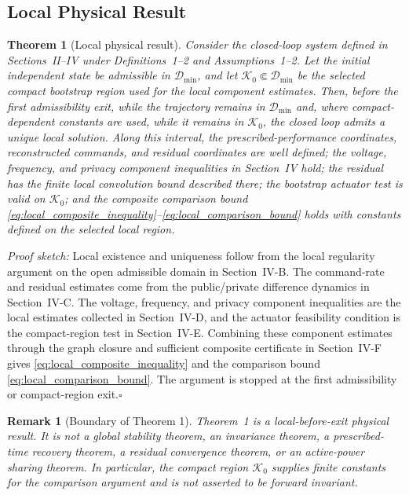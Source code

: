 \documentclass[journal]{IEEEtran}
\newtheorem{theorem}{Theorem}
\newtheorem{remark}{Remark}
\begin{document}
\subsection{Local Physical Result}

\begin{theorem}[Local physical result]
Consider the closed-loop system defined in Sections~II--IV under
Definitions~1--2 and Assumptions~1--2. Let the initial independent state be
admissible in $\mathcal D_{\min}$, and let $\mathcal K_0\Subset
\mathcal D_{\min}$ be the selected compact bootstrap region used for the local
component estimates. Then, before the first admissibility exit, while the
trajectory remains in $\mathcal D_{\min}$ and, where compact-dependent constants
are used, while it remains in $\mathcal K_0$, the closed loop admits a unique
local solution. Along this interval, the prescribed-performance coordinates,
reconstructed commands, and residual coordinates are well defined; the voltage,
frequency, and privacy component inequalities in Section~IV hold; the residual
has the finite local convolution bound described there; the bootstrap actuator
test is valid on $\mathcal K_0$; and the composite comparison bound
\eqref{eq:local_composite_inequality}--\eqref{eq:local_comparison_bound}
holds with constants defined on the selected local region.
\end{theorem}

\noindent\textit{Proof sketch:}
Local existence and uniqueness follow from the local regularity argument on the
open admissible domain in Section~IV-B. The command-rate and residual estimates
come from the public/private difference dynamics in Section~IV-C. The voltage,
frequency, and privacy component inequalities are the local estimates collected
in Section~IV-D, and the actuator feasibility condition is the compact-region
test in Section~IV-E. Combining these component estimates through the graph
closure and sufficient composite certificate in Section~IV-F gives
\eqref{eq:local_composite_inequality} and the comparison bound
\eqref{eq:local_comparison_bound}. The argument is stopped at the first
admissibility or compact-region exit.\hfill$\square$

\begin{remark}[Boundary of Theorem 1]
Theorem~1 is a local-before-exit physical result. It is not a global stability
theorem, an invariance theorem, a prescribed-time recovery theorem, a residual
convergence theorem, or an active-power sharing theorem. In particular, the
compact region $\mathcal K_0$ supplies finite constants for the comparison
argument and is not asserted to be forward invariant.
\end{remark}
\end{document}
